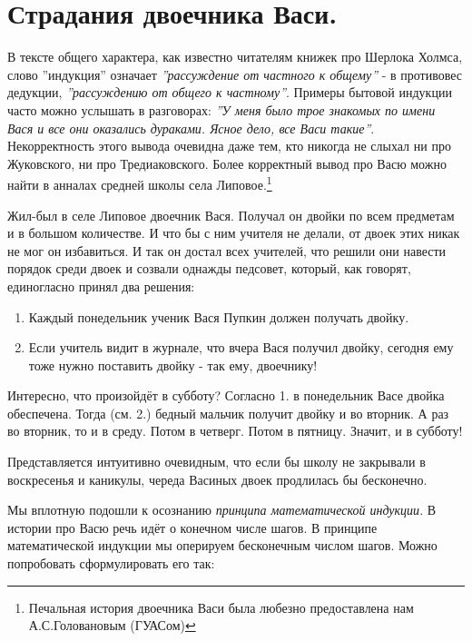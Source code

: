 
\section*{Страдания двоечника Васи.}

В тексте общего характера, как известно читателям книжек про Шерлока Холмса, слово ''индукция'' означает \textit{''рассуждение от частного к общему''} - в противовес дедукции, \textit{''рассуждению от общего к частному''}. Примеры бытовой индукции часто можно услышать в разговорах: \textit{''У меня было трое знакомых по имени Вася и все они оказались дураками. Ясное дело, все Васи такие''}. Некорректность этого вывода очевидна даже тем, кто никогда не слыхал ни про Жуковского, ни про Тредиаковского. Более корректный вывод про Васю можно найти в анналах средней школы села Липовое.\footnote{Печальная история двоечника Васи была любезно предоставлена нам А.С.Головановым (ГУАСом)}

Жил-был в селе Липовое двоечник Вася. Получал он двойки по всем предметам и в большом количестве. И что бы с ним учителя не делали, от двоек этих никак не мог он избавиться. И так он достал
всех учителей, что решили они навести порядок среди двоек и созвали однажды педсовет, который, как говорят, единогласно принял два решения:
\begin{enumerate}
\item Каждый понедельник ученик Вася Пупкин должен получать двойку.
\item Если учитель видит в журнале, что вчера Вася получил двойку, сегодня ему тоже нужно поставить двойку - так ему, двоечнику!
\end{enumerate}

Интересно, что произойдёт в субботу? Согласно 1. в понедельник Васе двойка обеспечена. Тогда (см. 2.) бедный мальчик получит двойку и во вторник. А раз во вторник, то и в среду. Потом в четверг. Потом в пятницу. Значит, и в субботу!

Представляется интуитивно очевидным, что если бы школу не закрывали в воскресенья и каникулы, череда Васиных двоек продлилась бы бесконечно.

Мы вплотную подошли к осознанию \textit{принципа математической индукции}. В истории про Васю речь идёт о конечном числе шагов. В принципе математической индукции мы оперируем бесконечным
числом шагов. Можно попробовать сформулировать его так:


